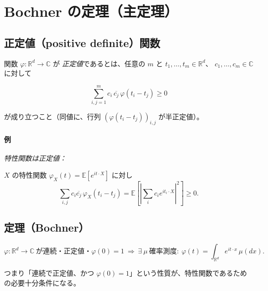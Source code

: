 \documentclass[uplatex,dvipdfmx,11pt,a4paper,openany]{bxjsbook}
\begin{document}
\section{Bochner の定理（主定理）}
\subsection{正定値（positive definite）関数}
関数 $\varphi:\mathbb R^d\to\mathbb C$ が \emph{正定値}であるとは、任意の $m$ と $t_1,\dots,t_m\in\mathbb R^d$、
        $c_1,\dots,c_m\in\mathbb C$ に対して

\[\sum_{i,j=1}^m c_i\,\overline{c_j}\,\varphi(t_i-t_j)\ge 0\]

が成り立つこと（同値に、行列 $(\varphi(t_i-t_j))_{i,j}$ が半正定値）。

\paragraph{例}
\emph{特性関数は正定値：}

$X$ の特性関数 $\varphi_X(t)=\mathbb E[e^{it\cdot X}]$ に対し \[\sum_{i,j} c_i\overline{c_j}\,\varphi_X(t_i-t_j) =\mathbb E\left[\left|\sum_i c_i e^{it_i\cdot X}\right|^2\right]\ge 0.\]


\subsection{定理（Bochner）}
\[\varphi:\mathbb R^d\to\mathbb C\ \text{が連続・正定値・}\varphi(0)=1
        \ \Longrightarrow\
        \exists\ \mu\ \text{確率測度}:\ 
        \varphi(t)=\int_{\mathbb R^d} e^{it\cdot x}\,\mu(dx).\]

つまり「連続で正定値、かつ $\varphi(0)=1$」という性質が、特性関数であるための必要十分条件になる。
\end{document}
